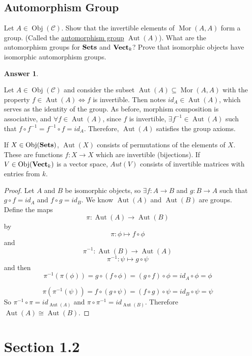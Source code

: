 \documentclass[hidelinks,12pt]{article}
\newcommand{\ul}{\underline}
\newtheorem*{answer}{Answer}
\newcommand{\aut}{\operatorname{Aut}}
\newcommand{\obj}{\operatorname{Obj}}
\newcommand{\mor}{\operatorname{Mor}}
\newcommand{\catname}[1]{{\normalfont\mathbf{#1}}}
\begin{document}
\subsection{Automorphism Group} Let \(A\in\obj(\mathcal{C})\). Show that the invertible elements of \(\mor(A,A)\) form a group. (Called the \ul{automorphism group} \(\aut(A)\)). What are the automorphism groups for \(\catname{Sets}\) and \(\catname{Vect}_{k}\)? Prove that isomorphic objects have isomorphic automorphism groups. \begin{answer} \end{answer}
Let \(A\in\obj(\mathcal{C})\) and consider the subset \(\aut(A)\subseteq\mor(A,A)\) with the property \(f\in\aut(A)\iff f\) is invertible. Then notes \(id_{A}\in\aut(A)\), which serves as the identity of the group. As before, morphism composition is associative, and \(\forall f\in\aut(A)\), since \(f\) is invertible, \(\exists f^{-1}\in\aut(A)\) such that \(f\circ f^{-1}=f^{-1}\circ f=id_{A}\). Therefore, \(\aut(A)\) satisfies the group axioms.
\par If \(X\in\obj(\catname{Sets})\), \(\aut(X)\) consists of permutations of the elements of \(X\). These are functions \(f:X\to X\) which are invertible (bijections). If \(V\in\obj(\catname{Vect}_{k})\) is a vector space, \(Aut(V)\) consists of invertible matrices with entries from \(k\).
\begin{proof}
    Let \(A\) and \(B\) be isomorphic objects, so \(\exists f:A\to B\) and \(g:B\to A\) such that \(g\circ f=id_{A}\) and \(f\circ g=id_{B}\). We know \(\aut(A)\) and \(\aut(B)\) are groups. Define the maps
    \[
        \pi:\aut(A)\to\aut(B)
    \]
    by \[
        \pi:\phi\mapsto f\circ\phi
    \]
    and \[
        \pi^{-1}:\aut(B)\to\aut(A)
    \]
    \[
        \pi^{-1}:\psi\mapsto g\circ\psi
    \]
    and then
    \[
        \pi^{-1}(\pi(\phi))=g\circ(f\circ\phi)=(g\circ f)\circ\phi=id_{A}\circ\phi=\phi
    \]

    \[
        \pi(\pi^{-1}(\psi))=f\circ (g\circ \psi)=(f\circ g)\circ\psi=id_{B}\circ\psi=\psi
    \]
    So \(\pi^{-1}\circ\pi=id_{\aut(A)}\) and \(\pi\circ\pi^{-1}=id_{\aut(B)}\). Therefore \(\aut(A)\cong\aut(B)\).
\end{proof}
\section{Section 1.2}
\end{document}
